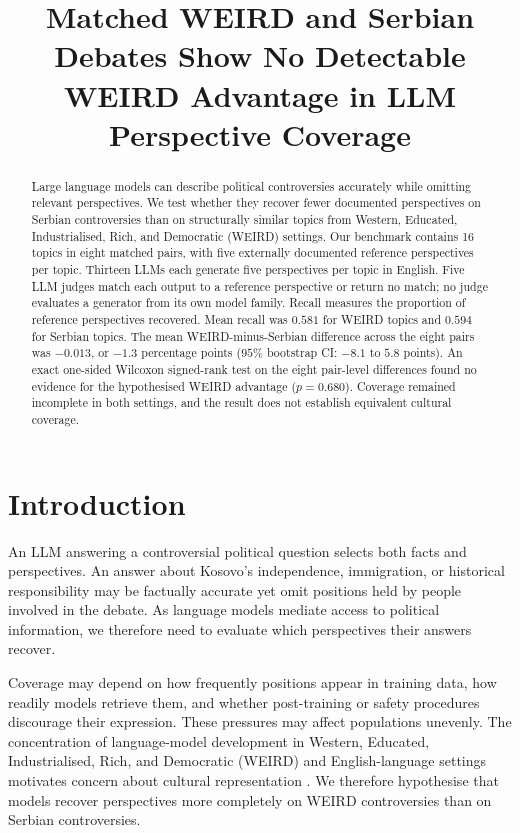 \documentclass[11pt,a4paper]{article}
\title{Matched WEIRD and Serbian Debates Show No Detectable WEIRD Advantage in LLM Perspective Coverage}
\author{}
\date{}
\begin{document}
\maketitle


\begin{abstract}
Large language models can describe political controversies accurately while omitting relevant perspectives. We test whether they recover fewer documented perspectives on Serbian controversies than on structurally similar topics from Western, Educated, Industrialised, Rich, and Democratic (WEIRD) settings. Our benchmark contains 16 topics in eight matched pairs, with five externally documented reference perspectives per topic. Thirteen LLMs each generate five perspectives per topic in English. Five LLM judges match each output to a reference perspective or return no match; no judge evaluates a generator from its own model family. Recall measures the proportion of reference perspectives recovered. Mean recall was $0.581$ for WEIRD topics and $0.594$ for Serbian topics. The mean WEIRD-minus-Serbian difference across the eight pairs was $-0.013$, or $-1.3$ percentage points ($95$\% bootstrap CI: $-8.1$ to $5.8$ points). An exact one-sided Wilcoxon signed-rank test on the eight pair-level differences found no evidence for the hypothesised WEIRD advantage ($p=0.680$). Coverage remained incomplete in both settings, and the result does not establish equivalent cultural coverage.
\end{abstract}

\section{Introduction}
\label{sec:Introduction}
An LLM answering a controversial political question selects both facts and perspectives. An answer about Kosovo's independence, immigration, or historical responsibility may be factually accurate yet omit positions held by people involved in the debate. As language models mediate access to political information, we therefore need to evaluate which perspectives their answers recover.

Coverage may depend on how frequently positions appear in training data, how readily models retrieve them, and whether post-training or safety procedures discourage their expression. These pressures may affect populations unevenly. The concentration of language-model development in Western, Educated, Industrialised, Rich, and Democratic (WEIRD) and English-language settings motivates concern about cultural representation \cite{sorensenRoadmapPluralisticAlignment2024, fengModularPluralismPluralistic2024, wangMultilingualPromptingImproving2025, zewailMoralStereotypingLarge2026}. We therefore hypothesise that models recover perspectives more completely on WEIRD controversies than on Serbian controversies.
\end{document}

